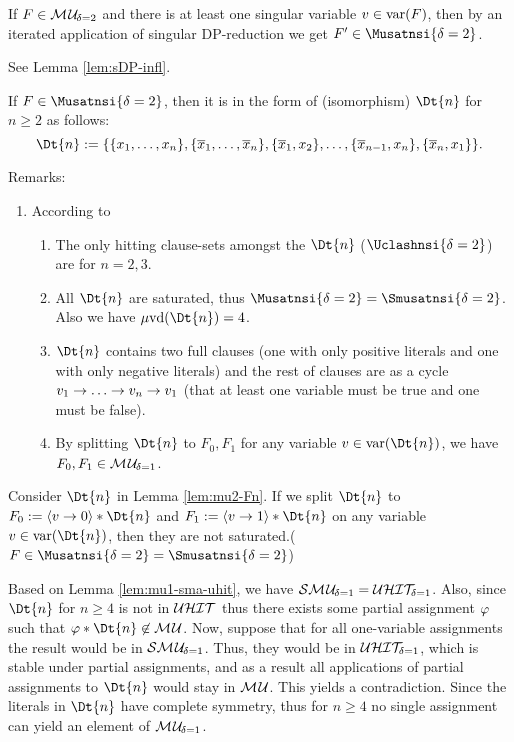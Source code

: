 \documentclass{article}
\begin{document}
\begin{lem}\label{lem:mu2-mup}
If $F \in \mathcal{M\hspace{0.8pt}U}_{\!\delta=2}$ and there is at least one singular variable $v \in \operatorname{var}(F)$, then by an iterated application of singular DP-reduction we get $F' \in \Musatnsi{\delta=2}$.
\end{lem}
\begin{prf}
See Lemma \ref{lem:sDP-infl}.
\end{prf}

\begin{lem}\label{lem:mu2-Fn}
\cite{KleineBuening2000SubclassesMU} If $F \in \Musatnsi{\delta=2}$, then it is in the form of (isomorphism) $\Dt{n}$  for $n \ge 2$ as follows:
  \begin{displaymath}
    \Dt{n} := \set{\set{x_1,\dots,x_n},\set{\ol x_1,\dots,\ol x_n},\set{\ol x_1,x_2}, \dots, \set{\ol x_{n-1},x_n}, \set{\ol x_n,x_1}}.
  \end{displaymath}

\end{lem}
Remarks:
  \begin{enumerate}
  \item According to \cite{KullmannZhao2010Extremal}
  \begin{enumerate}
  \item The only hitting clause-sets amongst the $\Dt{n}$ ($\Uclashnsi{\delta=2}$) are for $n=2,3$. 
  \item All $\Dt{n}$ are saturated, thus $\Musatnsi{\delta=2} = \Smusatnsi{\delta=2}$. Also we have $\minvdeg(\Dt{n}) = 4$. 
  \item $\Dt{n}$ contains two full clauses (one with only positive literals and one with only negative literals) and the rest of clauses are as a cycle $v_1 \ra \dots \ra v_n \ra v_1$ (that at least one variable must be true and one must be false).
  \item By splitting $\Dt{n}$ to $F_0, F_1$ for any variable $v \in \var(\Dt{n})$, we have $F_0, F_1 \in \mathcal{M\hspace{0.8pt}U}_{\!\delta=1} $.
  \end{enumerate} 
  \end{enumerate} 
  
\begin{lem}\label{lem:mu2-smu2}
Consider $\Dt{n}$ in Lemma \ref{lem:mu2-Fn}. If we split $\Dt{n}$ to $F_0:=\pao v0 * \Dt{n}$ and $F_1:=\pao v1 * \Dt{n}$ on any variable $v \in \var(\Dt{n})$, then they are not saturated.($F \in \Musatnsi{\delta=2} = \Smusatnsi{\delta=2}$)
\end{lem}
\begin{prf}
Based on Lemma \ref{lem:mu1-sma-uhit}, we have $\mathcal{S}\mathcal{M\hspace{0.8pt}U}_{\!\delta=1} = \mathcal{U}\mathcal{HIT}_{\!\!\delta=1}$. Also, since $\Dt{n}$ for $n \ge 4$ is not in $\mathcal{U}\mathcal{HIT}$ thus there exists some partial assignment $\varphi$ such that $\vp * \Dt{n} \not \in \Musat$. Now, suppose that for all one-variable assignments the result would be in $\mathcal{S}\mathcal{M\hspace{0.8pt}U}_{\!\delta=1}$. Thus, they would be in $\mathcal{U}\mathcal{HIT}_{\!\!\delta=1}$, which is stable under partial assignments, and as a result all applications of partial assignments to $\Dt{n}$ would stay in $\mathcal{M\hspace{0.8pt}U}$. This yields a contradiction. Since  the literals in $\Dt{n}$ have complete symmetry, thus for $n \ge 4$ no single assignment can yield an element of $\mathcal{M\hspace{0.8pt}U}_{\!\delta=1}$.
\end{prf}
\end{document}

